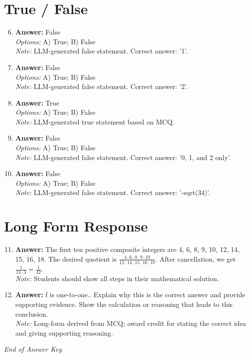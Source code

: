 \documentclass[12pt]{article}
\begin{document}
\section*{True / False}
\begin{enumerate}[label=\arabic*.]
\setcounter{enumi}{5}
\item \textbf{Answer:} False
\\ \textit{Options:} A) True; B) False
\\ \textit{Note:} LLM-generated false statement. Correct answer: '1'.
\item \textbf{Answer:} False
\\ \textit{Options:} A) True; B) False
\\ \textit{Note:} LLM-generated false statement. Correct answer: '2'.
\item \textbf{Answer:} True
\\ \textit{Options:} A) True; B) False
\\ \textit{Note:} LLM-generated true statement based on MCQ.
\item \textbf{Answer:} False
\\ \textit{Options:} A) True; B) False
\\ \textit{Note:} LLM-generated false statement. Correct answer: '0, 1, and 2 only'.
\item \textbf{Answer:} False
\\ \textit{Options:} A) True; B) False
\\ \textit{Note:} LLM-generated false statement. Correct answer: '-sqrt(34)'.
\end{enumerate}

\section*{Long Form Response}
\begin{enumerate}[label=\arabic*.]
\setcounter{enumi}{10}
\item \textbf{Answer:} The first ten positive composite integers are 4, 6, 8, 9, 10, 12, 14, 15, 16, 18. The desired quotient is $\frac{4\cdot 6\cdot 8\cdot 9\cdot 10}{12\cdot 14\cdot 15\cdot 16\cdot 18}$. After cancellation, we get $\frac{1}{14\cdot 3}=\boxed{\frac{1}{42}}$.
\\ \textit{Note:} Students should show all steps in their mathematical solution.
\item \textbf{Answer:} f is one-to-one.. Explain why this is the correct answer and provide supporting evidence. Show the calculation or reasoning that leads to this conclusion.
\\ \textit{Note:} Long-form derived from MCQ; award credit for stating the correct idea and giving supporting reasoning.
\end{enumerate}

\vfill
\noindent\textit{End of Answer Key}
\end{document}
